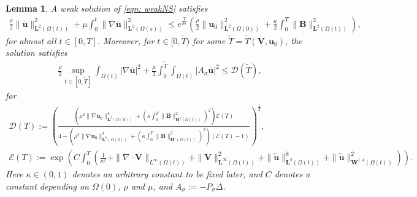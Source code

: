 \documentclass[a4paper]{amsart}
\numberwithin{equation}{section}
\newcommand{\grad}{\nabla}
\newcommand{\Div}{\nabla \cdot}
\theoremstyle{plain}
\newtheorem{lemma}[theorem]{Lemma}
\newcommand{\mbf}[1]{\mathbf{#1}}
\begin{document}
\begin{lemma}
\label{lemma: fsi energy estimates}
	A weak solution of \eqref{eqn: weakNS} satisfies 
	\begin{align}
		\frac{\rho}{2} \|\overline{\mbf{u}}\|_{\mbf{L}^2(\Omega(t))}^2 + \mu \int_0^t\|\grad\overline{\mbf{u}}\|_{\mbf{L}^2(\Omega(s))}^2 \leq e^{\frac{T}{\rho\kappa}}\left( \frac{\rho}{2}\|\mbf{u}_0\|_{\mbf{L}^2(\Omega(0))}^2 + \frac{\kappa}{2}\int_0^T \|\mbf{B}\|_{\mbf{L}^2(\Omega(t))}^2 \right), \label{fsi energyestimate1}
	\end{align}
	for almost all $t \in [0,T]$.
	Moreover, for $t \in [0,\widetilde{T})$ for some $\widetilde{T}=\widetilde{T}(\mbf{V},\mbf{u}_0)$, the solution satisfies
	\begin{align}
		\frac{\rho}{2} \sup_{t \in [0,\widetilde{T}]} \int_{\Omega(t)} |\grad \overline{\mbf{u}}|^2 + \frac{\mu}{2} \int_0^{\widetilde{T}}\int_{\Omega(t)} |A_{\sigma} \overline{\mbf{u}}|^2 \leq  \mathcal{D}(\widetilde{T}), \label{fsi energyestimate2}
	\end{align}
	for
    \begin{gather*}
        \mathcal{D}(T) := \left(\frac{ \left(\rho^2 \|\grad \mbf{u}_0\|_{\mbf{L}^2(\Omega(0))}^4 + \left(\kappa \int_0^{T} \|\mbf{B}\|_{\mbf{H}^1(\Omega(t))}^2\right)^2\right) \mathcal{E}(T)}{4 - \left(\rho^2 \|\grad \mbf{u}_0\|_{\mbf{L}^2(\Omega(0))}^4 + \left( \kappa\int_0^{T} \|\mbf{B}\|_{\mbf{H}^1(\Omega(t))}^2\right)^2\right)(\mathcal{E}(T)-1)} \right)^\frac{1}{2},\\
        \mathcal{E}(T) := \exp\left(C\int_0^{T}\left(\frac{1}{\kappa^2} + \|\Div\mbf{V}\|_{L^\infty(\Omega(t))} + \|\mbf{V}\|_{\mbf{L}^\infty(\Omega(t))}^2 +\|\widetilde{\mbf{u}}\|_{\mbf{L}^4(\Omega(t))}^8 +\|\widetilde{\mbf{u}}\|_{\mbf{W}^{1,4}(\Omega(t))}^2\right)\right).
    \end{gather*}
    Here $\kappa \in (0,1)$ denotes an arbitrary constant to be fixed later, and $C$ denotes a constant depending on $\Omega(0)$, $\rho$ and $\mu$, and $A_{\sigma} := -P_{\sigma} \Delta$.
\end{lemma}
\end{document}
